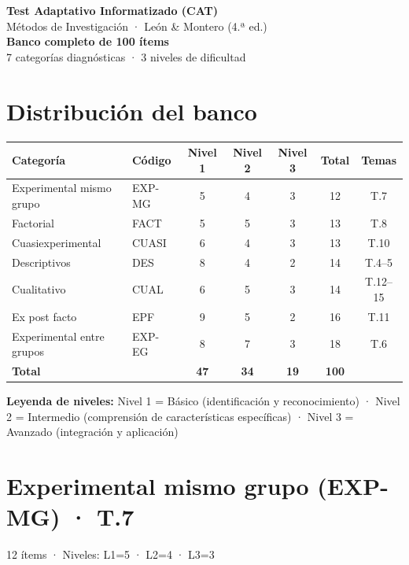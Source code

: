 \documentclass[12pt,a4paper]{article}
\begin{document}
\begin{center}
{\LARGE\bfseries\color{azul} Test Adaptativo Informatizado (CAT)}\\[6pt]
{\Large Métodos de Investigación · León \& Montero (4.ª ed.)}\\[10pt]
{\large\bfseries Banco completo de 100 ítems}\\[4pt]
{\normalsize\color{gris} 7 categorías diagnósticas · 3 niveles de dificultad}
\end{center}
\vspace{8pt}
\section*{Distribución del banco}

\begin{center}
\begin{tabular}{llccccc}
\toprule
\textbf{Categoría} & \textbf{Código} & \textbf{Nivel 1} & \textbf{Nivel 2} & \textbf{Nivel 3} & \textbf{Total} & \textbf{Temas}\\
\midrule
Experimental mismo grupo & EXP-MG & 5 & 4 & 3 & 12 & T.7\\
Factorial & FACT & 5 & 5 & 3 & 13 & T.8\\
Cuasiexperimental & CUASI & 6 & 4 & 3 & 13 & T.10\\
Descriptivos & DES & 8 & 4 & 2 & 14 & T.4--5\\
Cualitativo & CUAL & 6 & 5 & 3 & 14 & T.12--15\\
Ex post facto & EPF & 9 & 5 & 2 & 16 & T.11\\
Experimental entre grupos & EXP-EG & 8 & 7 & 3 & 18 & T.6\\
\midrule
\textbf{Total} & & \textbf{47} & \textbf{34} & \textbf{19} & \textbf{100} &\\
\bottomrule
\end{tabular}
\end{center}

\bigskip
\noindent\textbf{Leyenda de niveles:} \textcolor{azul}{Nivel 1 = Básico} (identificación y reconocimiento) · \textcolor{ambar}{Nivel 2 = Intermedio} (comprensión de características específicas) · \textcolor{rojo}{Nivel 3 = Avanzado} (integración y aplicación)

\newpage

\section{Experimental mismo grupo (EXP-MG) · T.7}
{\small\color{gris} 12 ítems · Niveles: L1=5 · L2=4 · L3=3}
\end{document}
